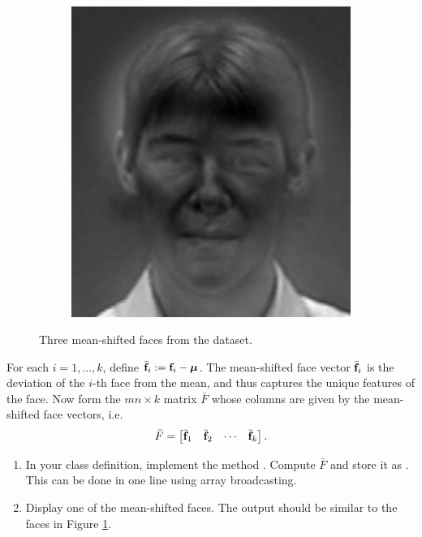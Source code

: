 \begin{figure}
\begin{subfigure}[b]{0.3\textwidth}
\end{subfigure}
\begin{subfigure}[b]{0.3\textwidth}
\includegraphics[width=\textwidth]{figures/differenceFace2.pdf}
\end{subfigure}
\caption{Three mean-shifted faces from the dataset.}
\label{facialRecognition:differenceFaces}
\end{figure}
For each $i = 1,\ldots, k$, define $\bar{\mathbf{f}}_i := \mathbf{f}_i - {\boldsymbol \mu}$.
The mean-shifted face vector $\bar{\mathbf{f}}_i$ is the deviation of the $i$-th face from the mean, and thus captures the unique features of the face.
Now form the $mn \times k$ matrix $\bar{F}$ whose columns are given by the mean-shifted face vectors, i.e.
\[
\bar{F} = \begin{bmatrix}
\bar{\mathbf{f}}_1 & \bar{\mathbf{f}}_2 & \cdots & \bar{\mathbf{f}}_k
\end{bmatrix}.
\]
\begin{problem}
\leavevmode
\begin{enumerate}
\item In your class definition, implement the method .
Compute $\bar{F}$ and store it as .
This can be done in one line using array broadcasting.
\item
Display one of the mean-shifted faces.
The output should be similar to the faces in Figure \ref{facialRecognition:differenceFaces}.
\end{enumerate}
\end{problem}



